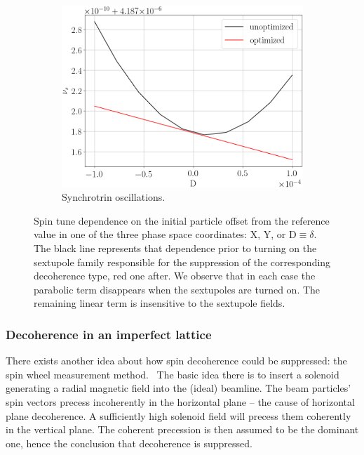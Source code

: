 \documentclass[]{elsarticle}
\begin{document}
\begin{figure}[h]\ContinuedFloat
  \begin{subfigure}{\linewidth}
    \includegraphics[width=\linewidth]{img/decoh/spin_tune_decoh_d_offset}
    \caption{Synchrotrin oscillations.}
  \end{subfigure}
  \caption{Spin tune dependence on the initial particle offset from the reference value in one of the three
    phase space coordinates: X, Y, or D$\equiv\delta$.
    The black line represents that dependence prior to turning on the sextupole family
    responsible for the suppression of the corresponding decoherence type, red one after.
    We observe that in each case the parabolic term disappears when the sextupoles are turned on.
    The remaining linear term is insensitive to the sextupole fields.
    \label{fig:decoh:ideal}}
\end{figure}

\subsubsection{Decoherence in an imperfect lattice}
There exists another idea about how spin decoherence could be suppressed:
the spin wheel measurement method.~\cite{Mane:SpinWheel}
The basic idea there is to insert a solenoid generating a radial magnetic field into the
(ideal) beamline. The beam particles' spin vectors precess incoherently in the horizontal plane -- the
cause of horizontal plane decoherence.
A sufficiently high solenoid field will precess them coherently in the vertical plane. The coherent precession
is then assumed to be the dominant one, hence the conclusion that decoherence is suppressed.
\end{document}
